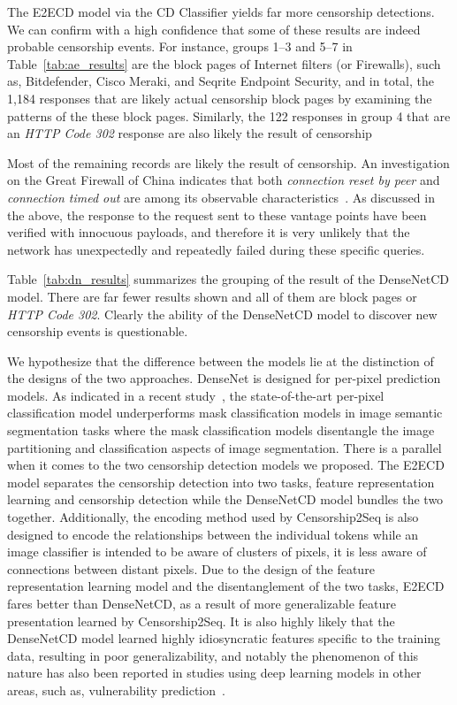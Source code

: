 The E2ECD model via the CD Classifier yields far more censorship detections. We
can confirm with a high confidence that some of these results are indeed 
probable censorship events. For instance, groups 1--3 and 5--7 in 
Table~\ref{tab:ae_results} are the block pages of Internet filters (or Firewalls), 
such as, Bitdefender, Cisco Meraki, and Seqrite Endpoint Security, and 
in total, the 1,184 responses that are likely actual
censorship block pages by examining the patterns of the these block
pages. Similarly,  the 122 responses in group 4 that are an \textit{HTTP Code 302} response
are also likely the result of censorship 

Most of the remaining records are likely the result of censorship.  
An investigation on the
Great Firewall of China indicates that both \textit{connection reset by peer}
and \textit{connection timed out} are among its observable
characteristics~\cite{shu_data_2014}.  As discussed in the above, 
the response to the request sent to
these vantage points have been verified with innocuous payloads, and therefore
it is very unlikely that the network has unexpectedly and repeatedly failed
during these specific queries.

Table~\ref{tab:dn_results} summarizes the grouping of the result of the
DenseNetCD model.  There are far fewer results shown and all of them are block
pages or \textit{HTTP Code 302}. Clearly the ability of the DenseNetCD model
to discover new censorship events is questionable. 

We hypothesize that the difference between the models lie at the distinction
of the designs of the two approaches. DenseNet is designed for per-pixel prediction models.
As indicated in a recent study~\cite{cheng2021per}, the state-of-the-art per-pixel 
classification model underperforms mask classification models in image semantic 
segmentation tasks where the
mask classification models disentangle the image partitioning and classification
aspects of image segmentation. There is a parallel when it comes to the two censorship
detection models we proposed. The E2ECD model separates the censorship detection
into two tasks, feature representation learning and censorship detection while the DenseNetCD 
model bundles the two together. Additionally, the encoding method used by Censorship2Seq is also designed
to encode the relationships between the individual tokens while an image classifier is intended
to be aware of clusters of pixels, it is less aware of connections between distant pixels. Due to the design of the feature 
representation learning model and the disentanglement of the two tasks, E2ECD fares better
than DenseNetCD, as a result of more generalizable feature presentation learned by Censorship2Seq. It
is also highly likely that the DenseNetCD model learned highly idiosyncratic features specific to 
the training data, resulting in poor generalizability, and notably the
phenomenon of this nature has also been reported in studies using deep
learning models in other areas, such as, vulnerability prediction~\cite{chakraborty2021deep}. 


